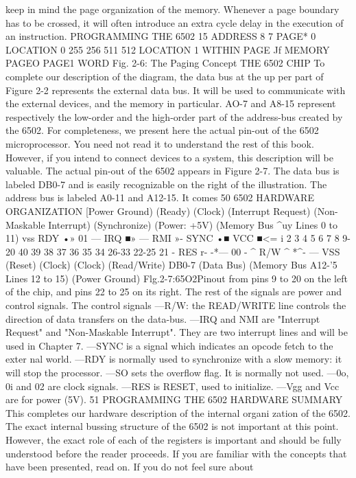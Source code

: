 \documentclass{book}
\begin{document}
keep in mind the page organization of the memory. Whenever a
page boundary has to be crossed, it will often introduce an extra
cycle delay in the execution of an instruction.
PROGRAMMING THE 6502
15
ADDRESS
8 7
PAGE*
0
LOCATION
0
255
256
511
512
LOCATION 1
WITHIN
PAGE Jf
MEMORY
PAGEO
PAGE1
WORD
Fig. 2-6: The Paging Concept
THE 6502 CHIP
To complete our description of the diagram, the data bus at the up
per part of Figure 2-2 represents the external data bus. It will be used to
communicate with the external devices, and the memory in particular.
AO-7 and A8-15 represent respectively the low-order and the high-order
part of the address-bus created by the 6502.
For completeness, we present here the actual pin-out of the
6502 microprocessor. You need not read it to understand the rest
of this book. However, if you intend to connect devices to a system,
this description will be valuable.
The actual pin-out of the 6502 appears in Figure 2-7. The data
bus is labeled DB0-7 and is easily recognizable on the right of the
illustration. The address bus is labeled A0-11 and A12-15. It comes
50
6502 HARDWARE ORGANIZATION
[Power Ground)
(Ready)
(Clock)
(Interrupt Request)
(Non-Maskable
Interrupt)
(Synchronize)
(Power: +5V)
(Memory Bus ^uy
Lines 0 to 11)
vss
RDY •»
01 —
IRQ ■»
—
RMI »-
SYNC •■
VCC
■<=
i
2
3
4
5
6
7
8
9-20
40
39
38
37
36
35
34
26-33
22-25
21
- RES
r-
-*— 00
-
^ R/W
^ *^-
— VSS
(Reset)
(Clock)
(Clock)
(Read/Write)
DB0-7 (Data Bus)
(Memory Bus
A12-'5 Lines 12 to 15)
(Power Ground)
Flg.2-7:65O2Pinout
from pins 9 to 20 on the left of the chip, and pins 22 to 25 on its
right.
The rest of the signals are power and control signals.
The control signals
—R/W: the READ/WRITE line controls the direction of data
transfers on the data-bus.
—IRQ and NMI are "Interrupt Request" and "Non-Maskable
Interrupt". They are two interrupt lines and will be used in
Chapter 7.
—SYNC is a signal which indicates an opcode fetch to the exter
nal world.
—RDY is normally used to synchronize with a slow memory: it
will stop the processor.
—SO sets the overflow flag. It is normally not used.
—0o, 0i and 02 are clock signals.
—RES is RESET, used to initialize.
—Vgg and Vcc are for power (5V).
51
PROGRAMMING THE 6502
HARDWARE SUMMARY
This completes our hardware description of the internal organi
zation of the 6502. The exact internal bussing structure of the
6502 is not important at this point. However, the exact role of
each of the registers is important and should be fully understood
before the reader proceeds. If you are familiar with the concepts
that have been presented, read on. If you do not feel sure about
\end{document}
